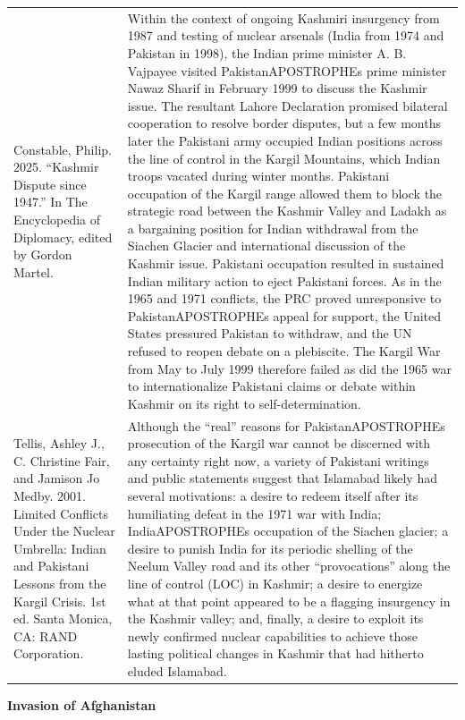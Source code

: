 {\begin{longtable}{p{}p{}}
Constable, Philip. 2025. “Kashmir Dispute since 1947.” In The Encyclopedia of Diplomacy, edited by Gordon Martel. &  Within the context of ongoing Kashmiri insurgency from 1987 and testing of nuclear arsenals (India from 1974 and Pakistan in 1998), the Indian prime minister A. B. Vajpayee visited PakistanAPOSTROPHEs prime minister Nawaz Sharif in February 1999 to discuss the Kashmir issue. The resultant Lahore Declaration promised bilateral cooperation to resolve border disputes, but a few months later the Pakistani army occupied Indian positions across the line of control in the Kargil Mountains, which Indian troops vacated during winter months. Pakistani occupation of the Kargil range allowed them to block the strategic road between the Kashmir Valley and Ladakh as a bargaining position for Indian withdrawal from the Siachen Glacier and international discussion of the Kashmir issue. Pakistani occupation resulted in sustained Indian military action to eject Pakistani forces. As in the 1965 and 1971 conflicts, the PRC proved unresponsive to PakistanAPOSTROPHEs appeal for support, the United States pressured Pakistan to withdraw, and the UN refused to reopen debate on a plebiscite. The Kargil War from May to July 1999 therefore failed as did the 1965 war to internationalize Pakistani claims or debate within Kashmir on its right to self-determination.
\\
Tellis, Ashley J., C. Christine Fair, and Jamison Jo Medby. 2001. Limited Conflicts Under the Nuclear Umbrella: Indian and Pakistani Lessons from the Kargil Crisis. 1st ed. Santa Monica, CA: RAND Corporation. & Although the “real” reasons for PakistanAPOSTROPHEs prosecution of the Kargil war cannot be discerned with any certainty right now, a variety of Pakistani writings and public statements suggest that Islamabad likely had several motivations: a desire to redeem itself after its humiliating defeat in the 1971 war with India; IndiaAPOSTROPHEs occupation of the Siachen glacier; a desire to punish India for its periodic shelling of the Neelum Valley road and its other “provocations” along the line of control (LOC) in Kashmir; a desire to energize what at that point appeared to be a flagging insurgency in the Kashmir valley; and, finally, a desire to exploit its newly confirmed nuclear capabilities to achieve those lasting political changes in Kashmir that had hitherto eluded Islamabad.
\\
\end{longtable}}
\clearpage
         \textbf{Invasion of Afghanistan} 

